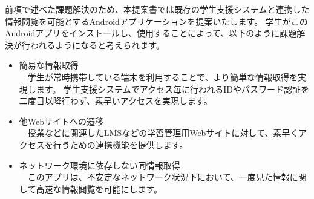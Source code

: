 前項で述べた課題解決のため、本提案書では既存の学生支援システムと連携した情報閲覧を可能とするAndroidアプリケーションを提案いたします。
学生がこのAndroidアプリをインストールし、使用することによって、以下のように課題解決が行われるようになると考えられます。
\begin{itemize}
\item 簡易な情報取得\\
　学生が常時携帯している端末を利用することで、より簡単な情報取得を実現します。
学生支援システムでアクセス毎に行われるIDやパスワード認証を二度目以降行わず、素早いアクセスを実現します。
\item 他Webサイトへの遷移\\
　授業などに関連したLMSなどの学習管理用Webサイトに対して、素早くアクセスを行うための連携機能を提供します。
\item ネットワーク環境に依存しない同情報取得\\
　このアプリは、不安定なネットワーク状況下において、一度見た情報に関して高速な情報閲覧を可能にします。
\end{itemize}　
